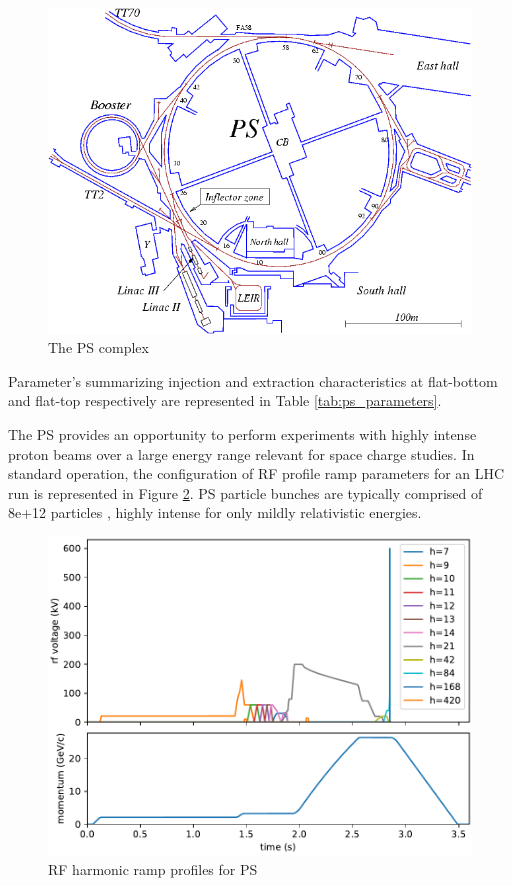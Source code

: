 \begin{figure}
    \centering
    \includegraphics{figs/pscomplex.png}
    \caption{The PS complex}
    \label{fig:ps_complex}
\end{figure}

Parameter's summarizing injection and extraction characteristics at flat-bottom and flat-top respectively are represented in Table \ref{tab:ps_parameters}.



The PS provides an opportunity to perform experiments with highly intense proton beams over a large energy range relevant for space charge studies. In standard operation, the configuration of RF profile ramp parameters for an LHC run is represented in Figure \ref{fig:ps_ramp}. PS particle bunches are typically comprised of 8e+12 particles \cite{migliorati_instability_2018}, highly intense for only mildly relativistic energies.

\begin{figure}
    \centering
    \includegraphics{figs/ps_profiles.pdf}
    \caption{RF harmonic ramp profiles for PS}
    \label{fig:ps_ramp}
\end{figure}

